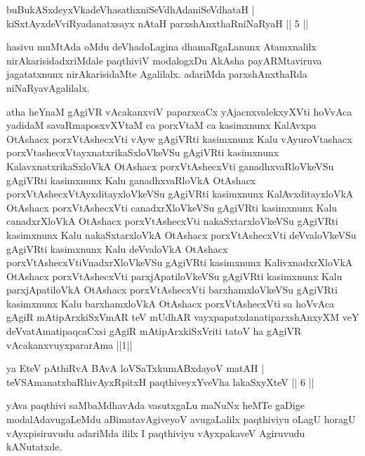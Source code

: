 \begin{shl}
buBukASxdeyxVkadeVhasathxniSeVdhAdaniSeVdhataH |\\
kiSxtAyxdeVviRyadanatxsayx nAtaH parxshAnxthaRniNaRyaH \hfill || 5 ||
\end{shl}

\begin{artha}%
hasivu muMtAda oMdu deVhadoLagina dhamaRgaLanunx Atamxnalilx nirAkarisidadxriMdale paqthiviV modalogxDu AkAsha payARMtaviruva jagatatxnunx nirAkarisidaMte Agalilalx. adariMda parxshAnxthaRda niNaRyavAgalilalx.
\end{artha}

\begin{shl}
atha heYnaM gAgiVR vAcakanxviV paparxcaCx yAjacnxvalekxyXVti hoVvAca yadidaM savaRmaposxvXVtaM ca porxVtaM ca kasimxnunx KalAvxpa OtAshacx porxVtAshecxVti vAyw gAgiVRti kasimxnunx Kalu vAyuroVtashacx porxVtashecxVtayxnatxrikaSxloVkeVSu gAgiVRti kasimxnunx KalavxnatxrikaSxloVkA OtAshacx porxVtAshecxVti ganadhxvaRloVkeVSu gAgiVRti kasimxnunx Kalu ganadhxvaRloVkA OtAshacx porxVtAshecxVtAyxditayxloVkeVSu gAgiVRti kasimxnunx KalAvxditayxloVkA OtAshacx porxVtAshecxVti canadxrXloVkeVSu gAgiVRti kasimxnunx Kalu canadxrXloVkA OtAshacx porxVtAshecxVti nakaSxtarxloVkeVSu gAgiVRti kasimxnunx Kalu nakaSxtarxloVkA OtAshacx porxVtAshecxVti deVvaloVkeVSu gAgiVRti kasimxnunx Kalu deVvaloVkA OtAshacx porxVtAshecxVtiVnadxrXloVkeVSu gAgiVRti kasimxnunx KalivxnadxrXloVkA OtAshacx porxVtAshecxVti parxjApatiloVkeVSu gAgiVRti kasimxnunx Kalu parxjApatiloVkA OtAshacx porxVtAshecxVti barxhamxloVkeVSu gAgiVRti kasimxnunx Kalu barxhamxloVkA OtAshacx porxVtAshecxVti sa hoVvAca gAgiR mAtipArxkiSxVmAR teV mUdhAR vayxpapatxdanatiparxshAnxyXM veY deVvatAmatipaqcaCxsi gAgiR mAtipArxkiSxVriti tatoV ha gAgiVR vAcakanxvuyxpararAma ||1||
\end{shl}


\begin{shl}
ya EteV pAthiRvA BAvA loVSaTxkumABxdayoV matAH |\\
teVSAmanatxbaRhivAyxRpitxH paqthiveyxYveVha lakaSxyXteV \hfill || 6 ||
\end{shl}

\begin{artha}
yAva paqthivi saMbaMdhavAda vasutxgaLu maNuNx heMTe gaDige modalAdavugaLeMdu aBimatavAgiveyoV avugaLalilx paqthiviyu oLagU horagU vAyxpisiruvudu adariMda ililx I paqthiviyu vAyxpakaveV Agiruvudu kANutatxde. 
\end{artha}

